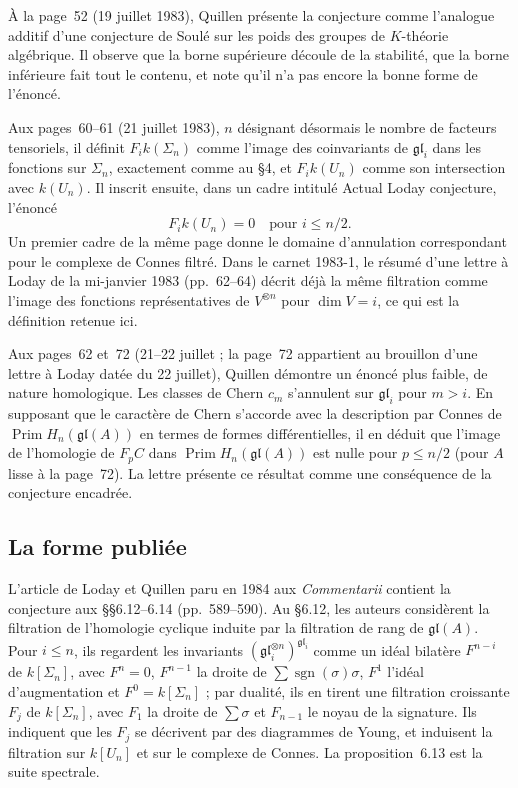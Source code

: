 \documentclass[11pt,a4paper]{amsart}
\theoremstyle{definition}
\theoremstyle{plain}
\theoremstyle{remark}
\newcommand{\gl}{\mathfrak{gl}}
\newcommand{\Prim}{\operatorname{Prim}}
\newcommand{\sgn}{\operatorname{sgn}}
\begin{document}
À la page~52 (19 juillet 1983), Quillen présente la conjecture comme l'analogue additif d'une conjecture de Soulé sur les poids des groupes de $K$-théorie algébrique. Il observe que la borne supérieure découle de la stabilité, que la borne inférieure fait tout le contenu, et note qu'il n'a pas encore la bonne forme de l'énoncé.

Aux pages~60--61 (21 juillet 1983), $n$ désignant désormais le nombre de facteurs tensoriels, il définit $F_i k(\Sigma_n)$ comme l'image des coinvariants de $\gl_i$ dans les fonctions sur $\Sigma_n$, exactement comme au \S4, et $F_i k(U_n)$ comme son intersection avec $k(U_n)$. Il inscrit ensuite, dans un cadre intitulé \og Actual Loday conjecture\fg{}, l'énoncé
\[
F_i k(U_n) = 0 \quad \text{pour } i \le n/2 .
\]
Un premier cadre de la même page donne le domaine d'annulation correspondant pour le complexe de Connes filtré. Dans le carnet 1983-1, le résumé d'une lettre à Loday de la mi-janvier 1983 (pp.~62--64) décrit déjà la même filtration comme l'image des fonctions représentatives de $V^{\otimes n}$ pour $\dim V = i$, ce qui est la définition retenue ici.

Aux pages~62 et~72 (21--22 juillet ; la page~72 appartient au brouillon d'une lettre à Loday datée du 22 juillet), Quillen démontre un énoncé plus faible, de nature homologique. Les classes de Chern $c_m$ s'annulent sur $\gl_i$ pour $m > i$. En supposant que le caractère de Chern s'accorde avec la description par Connes de $\Prim H_n(\gl(A))$ en termes de formes différentielles, il en déduit que l'image de l'homologie de $F_p C$ dans $\Prim H_n(\gl(A))$ est nulle pour $p \le n/2$ (pour $A$ lisse à la page~72). La lettre présente ce résultat comme une conséquence de la conjecture encadrée.

\subsection{La forme publiée}

L'article de Loday et Quillen paru en 1984 aux \emph{Commentarii} contient la conjecture aux \S\S6.12--6.14 (pp.~589--590). Au \S6.12, les auteurs considèrent la filtration de l'homologie cyclique induite par la filtration de rang de $\gl(A)$. Pour $i \le n$, ils regardent les invariants $(\gl_i^{\otimes n})^{\gl_i}$ comme un idéal bilatère $F^{n-i}$ de $k[\Sigma_n]$, avec $F^n = 0$, $F^{n-1}$ la droite de $\sum \sgn(\sigma)\sigma$, $F^1$ l'idéal d'augmentation et $F^0 = k[\Sigma_n]$ ; par dualité, ils en tirent une filtration croissante $F_j$ de $k[\Sigma_n]$, avec $F_1$ la droite de $\sum \sigma$ et $F_{n-1}$ le noyau de la signature. Ils indiquent que les $F_j$ se décrivent par des diagrammes de Young, et induisent la filtration sur $k[U_n]$ et sur le complexe de Connes. La proposition~6.13 est la suite spectrale.
\end{document}
